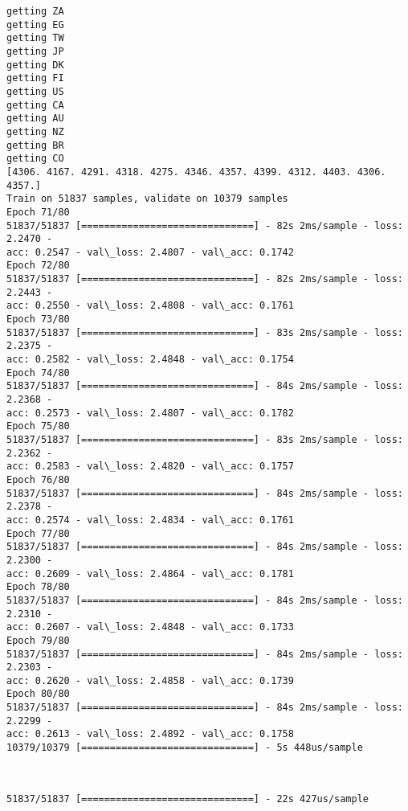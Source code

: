 \documentclass[11pt]{article}
\begin{document}
    \begin{Verbatim}[commandchars=\\\{\}]
getting ZA
getting EG
getting TW
getting JP
getting DK
getting FI
getting US
getting CA
getting AU
getting NZ
getting BR
getting CO
[4306. 4167. 4291. 4318. 4275. 4346. 4357. 4399. 4312. 4403. 4306. 4357.]
Train on 51837 samples, validate on 10379 samples
Epoch 71/80
51837/51837 [==============================] - 82s 2ms/sample - loss: 2.2470 -
acc: 0.2547 - val\_loss: 2.4807 - val\_acc: 0.1742
Epoch 72/80
51837/51837 [==============================] - 82s 2ms/sample - loss: 2.2443 -
acc: 0.2550 - val\_loss: 2.4808 - val\_acc: 0.1761
Epoch 73/80
51837/51837 [==============================] - 83s 2ms/sample - loss: 2.2375 -
acc: 0.2582 - val\_loss: 2.4848 - val\_acc: 0.1754
Epoch 74/80
51837/51837 [==============================] - 84s 2ms/sample - loss: 2.2368 -
acc: 0.2573 - val\_loss: 2.4807 - val\_acc: 0.1782
Epoch 75/80
51837/51837 [==============================] - 83s 2ms/sample - loss: 2.2362 -
acc: 0.2583 - val\_loss: 2.4820 - val\_acc: 0.1757
Epoch 76/80
51837/51837 [==============================] - 84s 2ms/sample - loss: 2.2378 -
acc: 0.2574 - val\_loss: 2.4834 - val\_acc: 0.1761
Epoch 77/80
51837/51837 [==============================] - 84s 2ms/sample - loss: 2.2300 -
acc: 0.2609 - val\_loss: 2.4864 - val\_acc: 0.1781
Epoch 78/80
51837/51837 [==============================] - 84s 2ms/sample - loss: 2.2310 -
acc: 0.2607 - val\_loss: 2.4848 - val\_acc: 0.1733
Epoch 79/80
51837/51837 [==============================] - 84s 2ms/sample - loss: 2.2303 -
acc: 0.2620 - val\_loss: 2.4858 - val\_acc: 0.1739
Epoch 80/80
51837/51837 [==============================] - 84s 2ms/sample - loss: 2.2299 -
acc: 0.2613 - val\_loss: 2.4892 - val\_acc: 0.1758
10379/10379 [==============================] - 5s 448us/sample
    \end{Verbatim}

    \begin{center}
    \end{center}
    { \hspace*{\fill} \\}
    
    \begin{Verbatim}[commandchars=\\\{\}]
51837/51837 [==============================] - 22s 427us/sample
    \end{Verbatim}

    \begin{center}
    \end{center}
    { \hspace*{\fill} \\}
    
\end{document}
